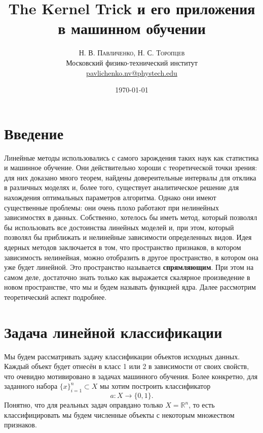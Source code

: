 \documentclass[twoside,twocolumn]{article}
\title{The Kernel Trick и его приложения в машинном обучении} %
\author{%
\textsc{Н. В. Павличенко, Н. С. Торопцев} \\[1ex] %
\normalsize Московский физико-технический институт \\ %
\normalsize \href{mailto:pavlichenko.nv@phystech.edu}{pavlichenko.nv@phystech.edu} %
}
\date{\today} %
\theoremstyle{plain}
\theoremstyle{definition}
\begin{document}
\maketitle


\section{Введение}

\lettrine[nindent=0em,lines=3]{Л} инейные методы использовались с самого зарождения таких наук как статистика и машинное обучение.
 Они действительно хороши с теоретической точки зрения: для них доказано много теорем, найдены
довереительные интервалы для отклика в различных моделях и, более того, существует аналитическое решение для нахождения
оптимальных параметров алгоритма. Однако они имеют существенные проблемы: они очень плохо работают при нелинейных
зависимостях в данных. Собственно, хотелось бы иметь метод, который позволял бы использовать все достоинства линейных моделей
и, при этом, который позволял бы приближать и нелинейные зависимости определенных видов. Идея ядерных методов заключается в
том, что пространство признаков, в котором зависимость нелинейная, можно отобразить в другое пространство, в котором она уже
будет линейной. Это пространство называется \textbf{спрямляющим}. При этом на самом деле, достаточно знать только как выражается скалярное
произведение в новом пространстве, что мы и будем называть функцией ядра. Далее рассмотрим теоретический аспект подробнее.

\section{Задача линейной классификации}
Мы будем рассматривать задачу классификации объектов исходных данных. Каждый объект будет отнесён в класс 1 или 2 в зависимости от своих свойств, что очевидно мотивировано в задачах машинного обучения. Более конкретно, для заданного набора $\{x\}_{i = 1}^n \subset X$ мы хотим построить классификатор 
\[a: X \xrightarrow{} \{0, 1\}.\]
Понятно, что для реальных задач оправдано только $X = \mathbb{R}^n$, то есть классифицировать мы будем численные объекты с некоторым множеством признаков.
\end{document}
